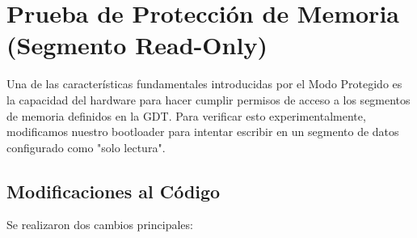 
\section{Prueba de Protección de Memoria (Segmento Read-Only)}

Una de las características fundamentales introducidas por el Modo Protegido es la capacidad del hardware para hacer cumplir permisos de acceso a los segmentos de memoria definidos en la GDT. Para verificar esto experimentalmente, modificamos nuestro bootloader para intentar escribir en un segmento de datos configurado como "solo lectura".

\subsection{Modificaciones al Código}

Se realizaron dos cambios principales:

